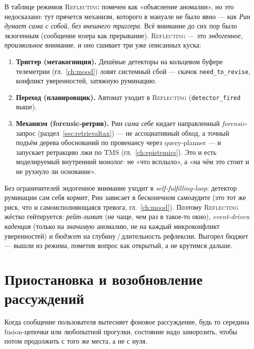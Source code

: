 В таблице режимов \textsc{Reflecting} помечен как «объяснение аномалии», но это
недосказано: тут прячется механизм, которого в мануале не было явно — \emph{как Рин
думает сама с собой, без внешнего триггера}. Всё внимание до сих пор было экзогенным
(сообщение юзера как прерывание). \textsc{Reflecting} — это \emph{эндогенное,
произвольное} внимание, и оно сшивает три уже описанных куска:
\begin{enumerate}\itemsep2pt
\item \textbf{Триггер (метакогниция).} Дешёвые детекторы на кольцевом буфере телеметрии
(гл.~\ref{ch:mood}) ловят системный сбой — скачок \texttt{need\_to\_revise}, конфликт
уверенностей, затяжную руминацию.
\item \textbf{Переход (планировщик).} Автомат уходит в \textsc{Reflecting}
(\texttt{detector\_fired} выше).
\item \textbf{Механизм (forensic-ретрив).} Рин \emph{сама себе} кидает направленный
\emph{forensic}-запрос (раздел~\ref{sec:retrievaltax}) — не ассоциативный обход, а точный
подъём дерева обоснований по провенансу через query-planner — и запускает ретракцию лжи
по TMS (гл.~\ref{ch:epistemics}). Это и есть моделируемый внутренний монолог: не «что
всплыло», а «на чём это стоит и не рухнуло ли основание».
\end{enumerate}

\begin{pitfall}
Без ограничителей эндогенное внимание уходит в \emph{self-fulfilling-loop}: детектор
руминации сам себя кормит, Рин зависает в бесконечном самоаудите (это тот же риск, что и
самоисполняющаяся тревога, гл.~\ref{ch:mood}). Поэтому \textsc{Reflecting} жёстко
гейтируется: \emph{рейт-лимит} (не чаще, чем раз в такое-то окно), \emph{event-driven
каденция} (только на \emph{значимую} аномалию, не на каждый микроконфликт уверенностей)
и \emph{бюджет} на глубину\,/\,длительность рефлексии. Выгорел бюджет — вышли из режима,
пометив вопрос как открытый, а не крутимся дальше.
\end{pitfall}

\section{Приостановка и возобновление рассуждений}
\label{sec:suspend}

Когда сообщение пользователя вытесняет фоновое рассуждение, будь то середина
fusion-цепочки или любопытной прогулки, состояние надо заморозить, чтобы потом
продолжить с того же места, а не с нуля.

